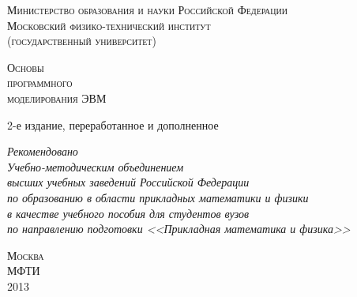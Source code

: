 
\thispagestyle{empty}

\begin{center}
\small
\textsc{Министерство образования и науки Российской Федерации \\
	Московский физико-технический институт \\
	(государственный университет) \\
}
\end{center}

\vfill

\begin{center}
	\begin{huge}
	\textsc{
	Основы\\
	программного\\
	моделирования ЭВМ\\
	}
	\end{huge}

\bigskip

	2-е издание, переработанное и дополненное
	
\end{center}



\begin{center}
    \small
    \textit{
		Рекомендовано \\
		Учебно-методическим объединением \\
		высших учебных заведений Российской Федерации\\
		по образованию в области прикладных математики и физики \\
		в качестве учебного пособия для студентов вузов\\
		по направлению подготовки <<Прикладная математика и физика>>
	}
\end{center}

\vfill

\begin{center}
    \textsc{Москва}\\
    \textsc{МФТИ}\\
    2013
\end{center}
